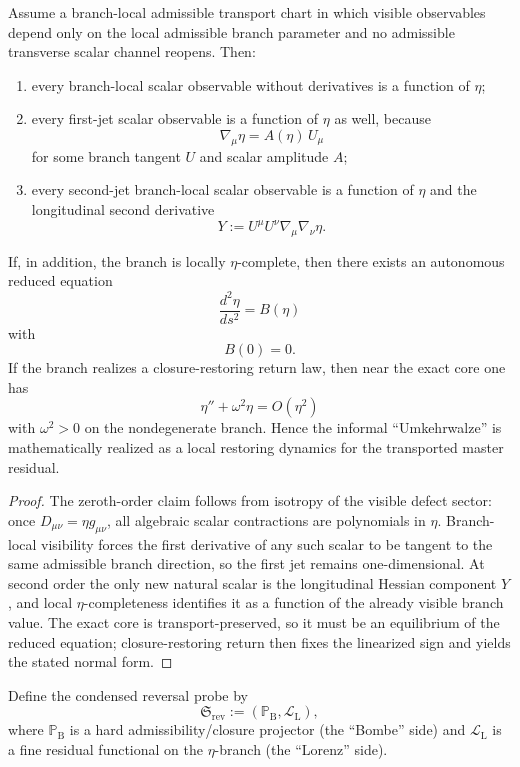 \begin{theorem}
\label{thm:eta-completeness-restoring}
Assume a branch-local admissible transport chart in which visible observables depend only on the local admissible branch parameter and no admissible transverse scalar channel reopens. Then:
\begin{enumerate}[label=(\roman*)]
  \item every branch-local scalar observable without derivatives is a function of $\eta$;
  \item every first-jet scalar observable is a function of $\eta$ as well, because
  \[
    \nabla_\mu \eta = A(\eta)\,U_\mu
  \]
  for some branch tangent $U$ and scalar amplitude $A$;
  \item every second-jet branch-local scalar observable is a function of $\eta$ and the longitudinal second derivative
  \[
    Y:=U^\mu U^\nu \nabla_\mu\nabla_\nu\eta.
  \]
\end{enumerate}
If, in addition, the branch is locally $\eta$-complete, then there exists an autonomous reduced equation
\[
  \frac{d^2\eta}{ds^2}=B(\eta)
\]
with
\[
  B(0)=0.
\]
If the branch realizes a closure-restoring return law, then near the exact core one has
\[
  \eta''+\omega^2\eta=O(\eta^2)
\]
with $\omega^2>0$ on the nondegenerate branch. Hence the informal ``Umkehrwalze'' is mathematically realized as a local restoring dynamics for the transported master residual.
\end{theorem}

\begin{proof}
The zeroth-order claim follows from isotropy of the visible defect sector: once $D_{\mu\nu}=\eta g_{\mu\nu}$, all algebraic scalar contractions are polynomials in $\eta$. Branch-local visibility forces the first derivative of any such scalar to be tangent to the same admissible branch direction, so the first jet remains one-dimensional. At second order the only new natural scalar is the longitudinal Hessian component $Y$, and local $\eta$-completeness identifies it as a function of the already visible branch value. The exact core is transport-preserved, so it must be an equilibrium of the reduced equation; closure-restoring return then fixes the linearized sign and yields the stated normal form.
\end{proof}

\begin{definition}
Define the condensed reversal probe by
\[
  \mathfrak S_{\mathrm{rev}}:=(\mathbb P_{\mathrm B},\mathcal L_{\mathrm L}),
\]
where $\mathbb P_{\mathrm B}$ is a hard admissibility/closure projector (the ``Bombe'' side) and $\mathcal L_{\mathrm L}$ is a fine residual functional on the $\eta$-branch (the ``Lorenz'' side).
\end{definition}

